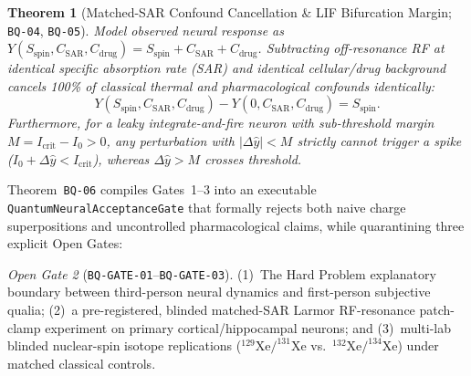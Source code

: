 \documentclass[11pt,a4paper]{article}
\theoremstyle{plain}
\newtheorem{theorem}{Theorem}[section]
\theoremstyle{remark}
\newtheorem{gate}[theorem]{Open Gate}
\newcommand{\code}[1]{\texttt{\small #1}}
\begin{document}
\begin{theorem}[Matched-SAR Confound Cancellation \& LIF Bifurcation Margin; \code{BQ-04}, \code{BQ-05}]
Model observed neural response as $Y(S_{\mathrm{spin}}, C_{\mathrm{SAR}}, C_{\mathrm{drug}}) = S_{\mathrm{spin}} + C_{\mathrm{SAR}} + C_{\mathrm{drug}}$. Subtracting off-resonance RF at identical specific absorption rate (SAR) and identical cellular/drug background cancels 100\% of classical thermal and pharmacological confounds identically:
\begin{equation}
  Y(S_{\mathrm{spin}}, C_{\mathrm{SAR}}, C_{\mathrm{drug}}) - Y(0, C_{\mathrm{SAR}}, C_{\mathrm{drug}}) = S_{\mathrm{spin}}.
\end{equation}
Furthermore, for a leaky integrate-and-fire neuron with sub-threshold margin $M = I_{\mathrm{crit}} - I_0 > 0$, any perturbation with $|\Delta\hat{y}| < M$ strictly cannot trigger a spike ($I_0 + \Delta\hat{y} < I_{\mathrm{crit}}$), whereas $\Delta\hat{y} > M$ crosses threshold.
\end{theorem}

Theorem~\code{BQ-06} compiles Gates~1--3 into an executable \code{QuantumNeuralAcceptanceGate} that formally rejects both naive charge superpositions and uncontrolled pharmacological claims, while quarantining three explicit Open Gates:

\begin{gate}[\code{BQ-GATE-01}--\code{BQ-GATE-03}]
(1)~The Hard Problem explanatory boundary between third-person neural dynamics and first-person subjective qualia; (2)~a pre-registered, blinded matched-SAR Larmor RF-resonance patch-clamp experiment on primary cortical/hippocampal neurons; and (3)~multi-lab blinded nuclear-spin isotope replications ($^{129}\mathrm{Xe}/^{131}\mathrm{Xe}$ vs.\ $^{132}\mathrm{Xe}/^{134}\mathrm{Xe}$) under matched classical controls.
\end{gate}
\end{document}
